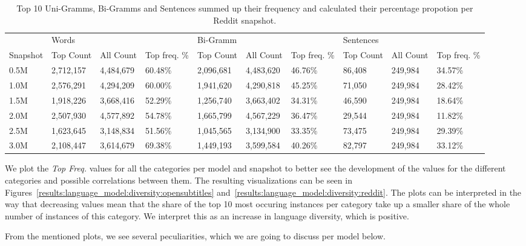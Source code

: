 \begin{table}[H]
	\centering
	\begin{adjustbox}{max width=\textwidth}
		\begin{tabular}{llllllllll}
			\toprule
			& Words &&&Bi-Gramm&&&Sentences&&\\
			Snapshot & Top Count & All Count& Top freq. \%&  Top Count& All Count& Top freq. \%&  Top Count& All Count& Top freq. \%\\
			\midrule
			0.5M & 2,712,157	 & 4,484,679	 & 60.48\%	&2,096,681	&4,483,620	&46.76\%	&86,408	&249,984	&34.57\%\\
			1.0M & 2,576,291	 & 4,294,209	 & 60.00\%	&1,941,620	&4,290,818	&45.25\%	&71,050	&249,984	&28.42\%\\
			1.5M & 1,918,226	 & 3,668,416	 & 52.29\%	&1,256,740	&3,663,402	&34.31\%	&46,590	&249,984	&18.64\%\\
			2.0M & 2,507,930	 & 4,577,892	 & 54.78\%	&1,665,799	&4,567,229	&36.47\%	&29,544	&249,984	&11.82\%\\
			2.5M & 1,623,645	 & 3,148,834	 & 51.56\%	&1,045,565	&3,134,900	&33.35\%	&73,475	&249,984	&29.39\%\\
			3.0M & 2,108,447	 & 3,614,679	 & 69.38\%	&1,449,193	&3,599,584	&40.26\%	&82,797	&249,984	&33.12\%\\
			\bottomrule
		\end{tabular}
	\end{adjustbox}
	\caption{Top 10 Uni-Gramms, Bi-Gramms and Sentences summed up their frequency and calculated their percentage propotion per Reddit snapshot.}
	\label{results:top_10_frequency:reddit}
\end{table}

We plot the \emph{Top Freq.} values for all the categories per model and snapshot to better see the development of the values for the different categories and possible correlations between them. The resulting visualizations can be seen in Figures~\ref{results:language_model:diversity:opensubtitles} and~\ref{results:language_model:diversity:reddit}. The plots can be interpreted in the way that decreasing values mean that the share of the top 10 most occuring instances per category take up a smaller share of the whole number of instances of this category. We interpret this as an increase in language diversity, which is positive.

From the mentioned plots, we see several peculiarities, which we are going to discuss per model below.

